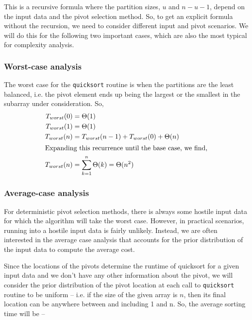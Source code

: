 \documentclass[]{finalproject}
\begin{document}
This is a recursive formula where the partition sizes, $u$ and $n-u-1$, depend on the input data and the pivot selection method. So, to get an explicit formula without the recursion, we need to consider different input and pivot scenarios. We will do this for the following two important cases, which are also the most typical for complexity analysis.

\subsubsection{Worst-case analysis}

The worst case for the \texttt{quicksort} routine is when the partitions are the least balanced, i.e. the pivot element ends up being the largest or the smallest in the subarray under consideration. So,
\begin{align*}
T_{worst}(0) &= \Theta(1) \\
T_{worst}(1) &= \Theta(1) \\
T_{worst}(n) &= T_{worst}(n-1) + T_{worst}(0) + \Theta(n) \\
\shortintertext{Expanding this recurrence until the base case, we find,}
T_{worst}(n) &= \sum_{k=1}^n\Theta(k) = \Theta(n^2)
\end{align*}

\subsubsection{Average-case analysis}

For deterministic pivot selection methods, there is always some hostile input data for which the algorithm will take the worst case. However, in practical scenarios, running into a hostile input data is fairly unlikely. Instead, we are often interested in the average case analysis that accounts for the prior distribution of the input data to compute the average cost.

Since the locations of the pivots determine the runtime of quicksort for a given input data and we don't have any other information about the pivot, we will consider the prior distribution of the pivot location at each call to \texttt{quicksort} routine to be uniform -- i.e. if the size of the given array is $n$, then its final location can be anywhere between and including 1 and n. So, the average sorting time will be --
\end{document}
